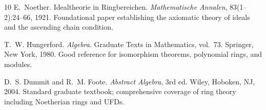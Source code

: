 \documentclass[12pt,a4paper]{amsart}
\theoremstyle{definition}
\theoremstyle{definition}
\begin{document}
\begin{thebibliography}{10}
E.~Noether.
\newblock Idealtheorie in Ringbereichen.
\newblock \textit{Mathematische Annalen}, 83(1--2):24--66, 1921.
\newblock Foundational paper establishing the axiomatic theory of ideals and the
ascending chain condition.

T.~W. Hungerford.
\newblock \textit{Algebra}.
\newblock Graduate Texts in Mathematics, vol.~73.
\newblock Springer, New York, 1980.
\newblock Good reference for isomorphism theorems, polynomial rings, and modules.

D.~S. Dummit and R.~M. Foote.
\newblock \textit{Abstract Algebra}, 3rd ed.
\newblock Wiley, Hoboken, NJ, 2004.
\newblock Standard graduate textbook; comprehensive coverage of ring theory including
Noetherian rings and UFDs.

\end{thebibliography}
\end{document}
